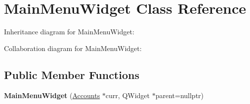 \hypertarget{classMainMenuWidget}{}\section{Main\+Menu\+Widget Class Reference}
\label{classMainMenuWidget}


Inheritance diagram for Main\+Menu\+Widget\+:


Collaboration diagram for Main\+Menu\+Widget\+:
\subsection*{Public Member Functions}
\begin{DoxyCompactItemize}
\item 
\mbox{\label{classMainMenuWidget_abedbc5ac35ef230d4cbcd5ebcffaa780}} 
{\bfseries Main\+Menu\+Widget} (\hyperlink{classAccounts}{Accounts} $\ast$curr, Q\+Widget $\ast$parent=nullptr)
\end{DoxyCompactItemize}
